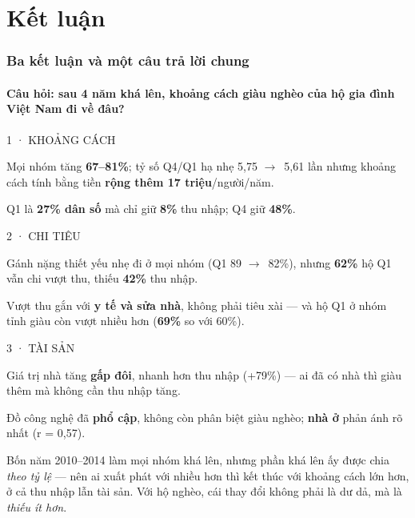 \documentclass[aspectratio=169,10pt,t]{beamer}
\newcommand{\ra}{$\rightarrow$}
\newcommand{\ask}[1]{{\color{ink2}Câu hỏi: #1}}
\newenvironment{cardrow}[1]{\begin{tcbraster}[raster columns=#1, raster equal height, raster column skip=6pt, raster row skip=5pt, raster before skip=0pt, raster after skip=0pt]}{\end{tcbraster}}
\newcommand{\card}[1]{\begin{tcolorbox}[card]#1\end{tcolorbox}}
\newcommand{\num}[1]{{\bfseries\color{stepdark}#1}}
\begin{document}
\section{Kết luận}
\begin{frame}\frametitle{Ba kết luận và một câu trả lời chung}
\framesubtitle{\ask{sau 4 năm khá lên, khoảng cách giàu nghèo của hộ gia đình Việt Nam đi về đâu?}}
\vspace{3pt}
\begin{cardrow}{3}
\card{{\medium\color{darkA} 1 · KHOẢNG CÁCH}\par\vspace{3pt}
Mọi nhóm tăng \num{67–81\%}; tỷ số Q4/Q1 hạ nhẹ 5,75 \ra\ 5,61 lần nhưng khoảng cách tính bằng tiền \num{rộng thêm 17 triệu}/người/năm.\par\vspace{3pt}
Q1 là \num{27\% dân số} mà chỉ giữ \num{8\%} thu nhập; Q4 giữ \num{48\%}.}
\card{{\medium\color{darkB} 2 · CHI TIÊU}\par\vspace{3pt}
Gánh nặng thiết yếu nhẹ đi ở mọi nhóm (Q1 89 \ra\ 82\%), nhưng \num{62\%} hộ Q1 vẫn chi vượt thu, thiếu \num{42\%} thu nhập.\par\vspace{3pt}
Vượt thu gắn với \num{y tế và sửa nhà}, không phải tiêu xài — và hộ Q1 ở nhóm tỉnh giàu còn vượt nhiều hơn (\num{69\%} so với 60\%).}
\card{{\medium\color{darkD} 3 · TÀI SẢN}\par\vspace{3pt}
Giá trị nhà tăng \num{gấp đôi}, nhanh hơn thu nhập (+79\%) — ai đã có nhà thì giàu thêm mà không cần thu nhập tăng.\par\vspace{3pt}
Đồ công nghệ đã \num{phổ cập}, không còn phân biệt giàu nghèo; \num{nhà ở} phản ánh rõ nhất (r = 0,57).}
\end{cardrow}
\vspace{6pt}
\begin{tcolorbox}[card, colback=tintI, left=8pt, right=8pt, top=4pt, bottom=4pt]
{\small\color{ink}\medium Bốn năm 2010–2014 làm mọi nhóm khá lên, nhưng phần khá lên ấy được chia \emph{theo tỷ lệ} — nên ai xuất phát với nhiều hơn thì kết thúc với khoảng cách lớn hơn, ở cả thu nhập lẫn tài sản. Với hộ nghèo, cái thay đổi không phải là dư dả, mà là \emph{thiếu ít hơn}.\par}
\end{tcolorbox}
\end{frame}
\end{document}
